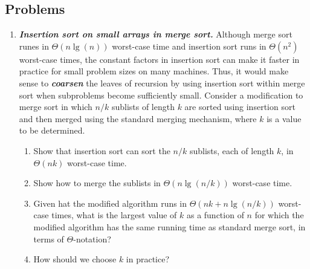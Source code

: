 \documentclass[Chapter02]{subfiles}
\begin{document}
	\subsection*{Problems}

	\begin{enumerate}[leftmargin=\labelsep,label={\textbf{\thesection-\arabic*}}]
		\item \textbf{\textit{Insertion sort on small arrays in merge sort.}} Although merge sort runes in $\Theta(n \lg(n))$ worst-case time and insertion sort runs in $\Theta(n^2)$ worst-case times, the constant factors in insertion sort can make it faster in practice for small problem sizes on many machines. Thus, it would make sense to \textbf{\textit{coarsen}} the leaves of recursion by using insertion sort within merge sort when subproblems become sufficiently small. Consider a modification to merge sort in which $n / k$ sublists of length $k$ are sorted using insertion sort and then merged using the standard merging mechanism, where $k$ is a value to be determined.
		\begin{enumerate}
			\item Show that insertion sort can sort the $n / k$ sublists, each of length $k$, in $\Theta(nk)$ worst-case time.
			\begin{answer}
				
			\end{answer}

			\item Show how to merge the sublists in $\Theta(n \lg(n / k))$ worst-case time.
			\begin{answer}
				
			\end{answer}
			
			\item Given hat the modified algorithm runs in $\Theta(nk + n\lg(n / k))$ worst-case times, what is the largest value of $k$ as a function of $n$ for which the modified algorithm has the same running time as standard merge sort, in terms of $\Theta$-notation?
			\begin{answer}
				
			\end{answer}
			
			\item How should we choose $k$ in practice?
			\begin{answer}
				
			\end{answer}
			

\end{enumerate}
\end{enumerate}
\end{document}

